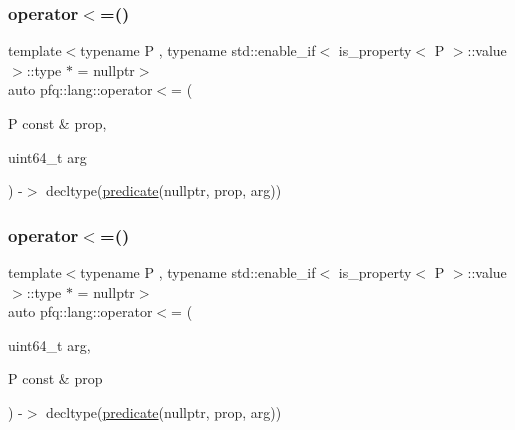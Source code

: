 \subsubsection{\texorpdfstring{operator$<$=()}{operator<=()}\hspace{0.1cm}{\footnotesize\ttfamily [1/2]}}
{\footnotesize\ttfamily template$<$typename P , typename std\+::enable\+\_\+if$<$ is\+\_\+property$<$ P $>$\+::value $>$\+::type $\ast$  = nullptr$>$ \\
auto pfq\+::lang\+::operator$<$= (\begin{DoxyParamCaption}\item[{P const \&}]{prop,  }\item[{uint64\+\_\+t}]{arg }\end{DoxyParamCaption}) -\/$>$ decltype(\hyperlink{namespacepfq_1_1lang_aca9adafc436b7f851621b979fa1aaf88}{predicate}(nullptr, prop, arg))
    \hspace{0.3cm}{\ttfamily [inline]}}

\mbox{\label{namespacepfq_1_1lang_ab78da35da3a46ac1e889653ace01c7a8}} 
\subsubsection{\texorpdfstring{operator$<$=()}{operator<=()}\hspace{0.1cm}{\footnotesize\ttfamily [2/2]}}
{\footnotesize\ttfamily template$<$typename P , typename std\+::enable\+\_\+if$<$ is\+\_\+property$<$ P $>$\+::value $>$\+::type $\ast$  = nullptr$>$ \\
auto pfq\+::lang\+::operator$<$= (\begin{DoxyParamCaption}\item[{uint64\+\_\+t}]{arg,  }\item[{P const \&}]{prop }\end{DoxyParamCaption}) -\/$>$ decltype(\hyperlink{namespacepfq_1_1lang_aca9adafc436b7f851621b979fa1aaf88}{predicate}(nullptr, prop, arg))
    \hspace{0.3cm}{\ttfamily [inline]}}

\mbox{\label{namespacepfq_1_1lang_a87c8fa322873efdbddaa437f194b72b0}} 
